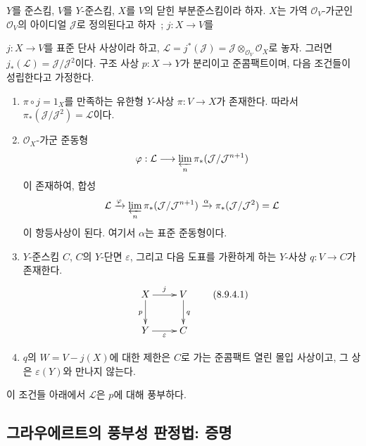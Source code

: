 \begin{proposition}[8.9.4]
\label{II.8.9.4-ko}
$Y$를 준스킴, $V$를 $Y$-준스킴, $X$를 $V$의 닫힌 부분준스킴이라
하자. $X$는 가역 $\mathcal{O}_V$-가군인 $\mathcal{O}_V$의 아이디얼
$\mathcal{J}$로 정의된다고 하자~; $j:X\to V$를

$j:X\to V$를 표준 단사 사상이라 하고,
$\mathcal{L}=j^*(\mathcal{J})=
\mathcal{J}\otimes_{\mathcal{O}_V}\mathcal{O}_X$로 놓자. 그러면
$j_*(\mathcal{L})=\mathcal{J}/\mathcal{J}^2$이다.
구조 사상 $p:X\to Y$가 분리이고 준콤팩트이며, 다음 조건들이
성립한다고 가정한다.
\begin{enumerate}
  \item[\rm{(i)}] $\pi\circ j=1_X$를 만족하는 유한형
  $Y$-사상 $\pi:V\to X$가 존재한다. 따라서
  $\pi_*(\mathcal{J}/\mathcal{J}^2)=\mathcal{L}$이다.
  \item[\rm{(ii)}] $\mathcal{O}_X$-가군 준동형
  \[
    \varphi:\mathcal{L}\longrightarrow
    \varprojlim_n\pi_*(\mathcal{J}/\mathcal{J}^{n+1})
  \]
  이 존재하여, 합성
  \[
    \mathcal{L}\xrightarrow{\varphi}
    \varprojlim_n\pi_*(\mathcal{J}/\mathcal{J}^{n+1})
    \xrightarrow{\alpha}\pi_*(\mathcal{J}/\mathcal{J}^2)=\mathcal{L}
  \]
  이 항등사상이 된다. 여기서 $\alpha$는 표준 준동형이다.
  \item[\rm{(iii)}] $Y$-준스킴 $C$, $C$의 $Y$-단면
  $\varepsilon$, 그리고 다음 도표를 가환하게 하는 $Y$-사상
  $q:V\to C$가 존재한다.
  \begin{equation}
  \label{II.8.9.4.1-ko}
    \xymatrix{
      X\ar[r]^{j}\ar[d]_{p} & V\ar[d]^{q}\\
      Y\ar[r]_{\varepsilon} & C
    }
  \tag{8.9.4.1}
  \end{equation}
  \item[\rm{(iv)}] $q$의 $W=V-j(X)$에 대한 제한은 $C$로 가는
  준콤팩트 열린 몰입 사상이고, 그 상은 $\varepsilon(Y)$와 만나지
  않는다.
\end{enumerate}
이 조건들 아래에서 $\mathcal{L}$은 $p$에 대해 풍부하다.
\end{proposition}

\subsection{그라우에르트의 풍부성 판정법: 증명}
\label{subsection:II.8.10-ko}

